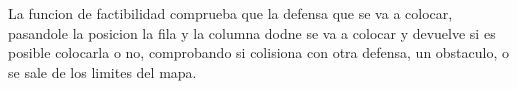 La funcion de factibilidad comprueba que la defensa que se va a colocar, pasandole la posicion la fila y la columna dodne se va a colocar y devuelve si es posible colocarla o no, comprobando si colisiona con otra defensa, un obstaculo, o se sale de los limites del mapa.
